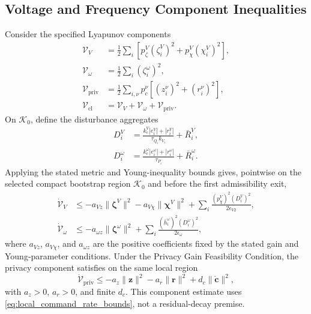 \documentclass[journal]{IEEEtran}
\begin{document}
\subsection{Voltage and Frequency Component Inequalities}

Consider the specified Lyapunov components
\begin{align}
\mathscr V_V
&=\frac{1}{2}\sum_i\!\left[p_\zeta^V(\zeta_i^V)^2
+p_\chi^V(\chi_i^V)^2\right],
\nonumber\\
\mathscr V_\omega
&=\frac{1}{2}\sum_i(\zeta_i^\omega)^2,
\nonumber\\
\mathscr V_{\mathrm{priv}}
&=\frac{1}{2}\sum_{i,\nu}p_c^\nu
\left[(z_i^\nu)^2+(r_i^\nu)^2\right],
\nonumber\\
\mathscr V_{\mathrm{cl}}
&=\mathscr V_V+\mathscr V_\omega+\mathscr V_{\mathrm{priv}}.
\label{eq:frozen_lyapunov_components}
\end{align}
On $\mathcal K_0$, define the disturbance aggregates
\begin{align}
D_i^V
&=\frac{k_c^V|e_i^V|+|r_i^V|}{\tau_{Q_i}k_{V_i}}
+\bar R_i^V,
\nonumber\\
D_i^\omega
&=\frac{k_c^\omega|e_i^\omega|+|r_i^\omega|}{\tau_{P_i}}
+\bar R_i^\omega.
\label{eq:component_disturbances}
\end{align}
Applying the stated metric and Young-inequality bounds gives, pointwise on the
selected compact bootstrap region $\mathcal K_0$ and before the first
admissibility exit,
\begin{align}
\dot{\mathscr V}_V
&\leq-a_{Vz}\|\bm\zeta^V\|^2-a_{V\chi}\|\bm\chi^V\|^2
+\sum_i\frac{(p_\chi^V)^2(D_i^V)^2}{2\epsilon_{V2}},
\label{eq:local_voltage_inequality}\\
\dot{\mathscr V}_\omega
&\leq-a_{\omega z}\|\bm\zeta^\omega\|^2
+\sum_i\frac{(\bar h_i^\omega)^2(D_i^\omega)^2}
{2\epsilon_\omega},
\label{eq:local_frequency_inequality}
\end{align}
where $a_{Vz}$, $a_{V\chi}$, and $a_{\omega z}$ are the positive coefficients
fixed by the stated gain and Young-parameter conditions. Under the Privacy Gain
Feasibility Condition, the privacy component satisfies on the same local region
\begin{equation}
\dot{\mathscr V}_{\mathrm{priv}}
\leq-a_z\|\bm z\|^2-a_r\|\bm r\|^2
+d_c\|\dot{\bm c}\|^2,
\label{eq:local_privacy_inequality}
\end{equation}
with $a_z>0$, $a_r>0$, and finite $d_c$. This component estimate uses
\eqref{eq:local_command_rate_bounds}, not a residual-decay premise.
\end{document}
